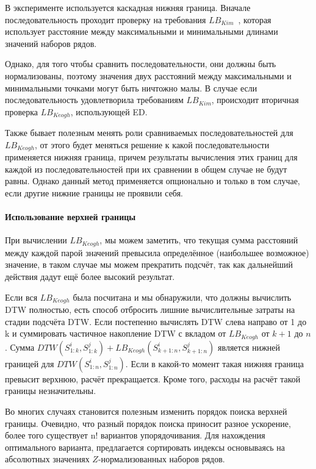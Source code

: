 \documentclass[12pt,twoside]{article}
\begin{document}
        В эксперименте используется каскадная нижняя граница.
        Вначале последовательность проходит проверку на требования $LB_{Kim}$~\cite{lbkim}, которая использует расстояние между максимальными и минимальными длинами значений наборов рядов. 
        
        Однако, для того чтобы сравнить последовательности, они должны быть нормализованы, поэтому значения двух расстояний между максимальными и минимальными точками могут быть ничтожно малы.
        В случае если последовательность удовлетворила требованиям $LB_{Kim}$, происходит вторичная проверка $LB_{Keogh}$, использующей ED.
        
        Также бывает полезным менять роли сравниваемых последовательностей для $LB_{Keogh}$, от этого будет меняться решение к какой последовательности применяется нижняя граница, причем результаты вычисления этих границ для каждой из последовательностей при их сравнении в общем случае не будут равны. Однако данный метод применяется опционально и только в том случае, если другие нижние границы не проявили себя.
        
        \paragraph{Использование верхней границы}
        При вычислении $LB_{Keogh}$, мы можем заметить, что текущая сумма расстояний между каждой парой значений превысила определённое (наибольшее возможное) значение, в таком случае мы можем прекратить подсчёт, так как дальнейший действия дадут ещё более высокий результат.
        
        Если вся $LB_{Keogh}$ была посчитана и мы обнаружили, что должны вычислить DTW полностью, есть способ отбросить лишние вычислительные затраты на стадии подсчёта DTW.
        Если постепенно вычислять DTW слева направо от 1 до k и суммировать частичное накопление DTW с вкладом от $LB_{Keogh}$ от $k + 1$ до $n$. 
        Сумма $DTW(S_{1:k}^i, S_{1:k}^j) + LB_{Keogh}(S_{k+1:n}^i, S_{k+1:n}^j)$ является нижней границей для $DTW(S_{1:n}^i, S_{1:n}^j)$.
        Если в какой-то момент такая нижняя граница превысит верхнюю, расчёт прекращается. Кроме того, расходы на расчёт такой границы незначительны.
        
        Во многих случаях становится полезным изменить порядок поиска верхней границы. Очевидно, что разный порядок поиска приносит разное ускорение, более того существует n! вариантов упорядочивания.
        Для нахождения оптимального варианта, предлагается сортировать индексы основываясь на абсолютных значениях $Z$\--нормализованных наборов рядов.
	
\end{document}
